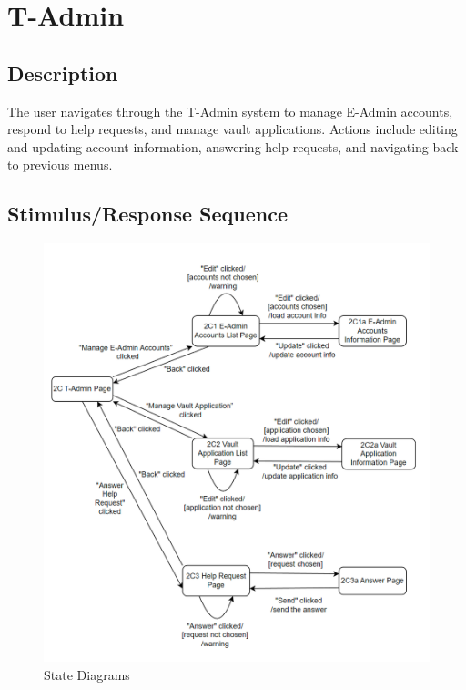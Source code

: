 \section{T-Admin}

\subsection{Description}
The user navigates through the T-Admin system to manage E-Admin accounts, respond to help requests, and manage vault applications. Actions include editing and updating account information, answering help requests, and navigating back to previous menus.


\subsection{Stimulus/Response Sequence}
\begin{figure}[H]
    \centering
    \includegraphics[width=0.75\linewidth]{picture/WechatIMG327.jpg}
    \caption{State Diagrams}
    \label{fig:enter-label}
\end{figure}

